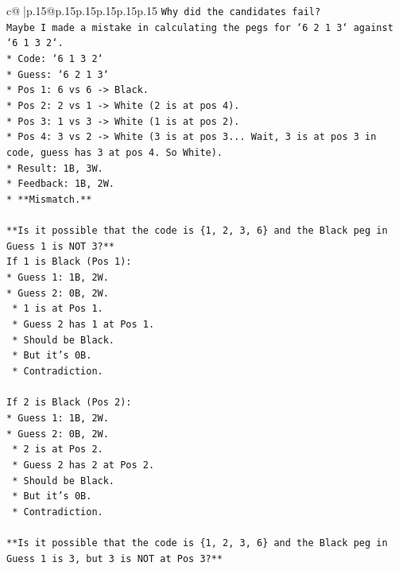 \documentclass{article}
\begin{document}
{\begin{supertabular}{c@{$\;$}|p{.15\linewidth}@{}p{.15\linewidth}p{.15\linewidth}p{.15\linewidth}p{.15\linewidth}p{.15\linewidth}}
{{{\texttt{Why did the candidates fail?} \\
\texttt{Maybe I made a mistake in calculating the pegs for `6 2 1 3` against `6 1 3 2`.} \\
\texttt{*   Code: `6 1 3 2`} \\
\texttt{*   Guess: `6 2 1 3`} \\
\texttt{*   Pos 1: 6 vs 6 {-}> Black.} \\
\texttt{*   Pos 2: 2 vs 1 {-}> White (2 is at pos 4).} \\
\texttt{*   Pos 3: 1 vs 3 {-}> White (1 is at pos 2).} \\
\texttt{*   Pos 4: 3 vs 2 {-}> White (3 is at pos 3... Wait, 3 is at pos 3 in code, guess has 3 at pos 4. So White).} \\
\texttt{*   Result: 1B, 3W.} \\
\texttt{*   Feedback: 1B, 2W.} \\
\texttt{*   **Mismatch.**} \\
\\ 
\texttt{**Is it possible that the code is \{1, 2, 3, 6\} and the Black peg in Guess 1 is NOT 3?**} \\
\texttt{If 1 is Black (Pos 1):} \\
\texttt{*   Guess 1: 1B, 2W.} \\
\texttt{*   Guess 2: 0B, 2W.} \\
\texttt{    *   1 is at Pos 1.} \\
\texttt{    *   Guess 2 has 1 at Pos 1.} \\
\texttt{    *   Should be Black.} \\
\texttt{    *   But it's 0B.} \\
\texttt{    *   Contradiction.} \\
\\ 
\texttt{If 2 is Black (Pos 2):} \\
\texttt{*   Guess 1: 1B, 2W.} \\
\texttt{*   Guess 2: 0B, 2W.} \\
\texttt{    *   2 is at Pos 2.} \\
\texttt{    *   Guess 2 has 2 at Pos 2.} \\
\texttt{    *   Should be Black.} \\
\texttt{    *   But it's 0B.} \\
\texttt{    *   Contradiction.} \\
\\ 
\texttt{**Is it possible that the code is \{1, 2, 3, 6\} and the Black peg in Guess 1 is 3, but 3 is NOT at Pos 3?**} \\
}}}
\end{supertabular}}
\end{document}
